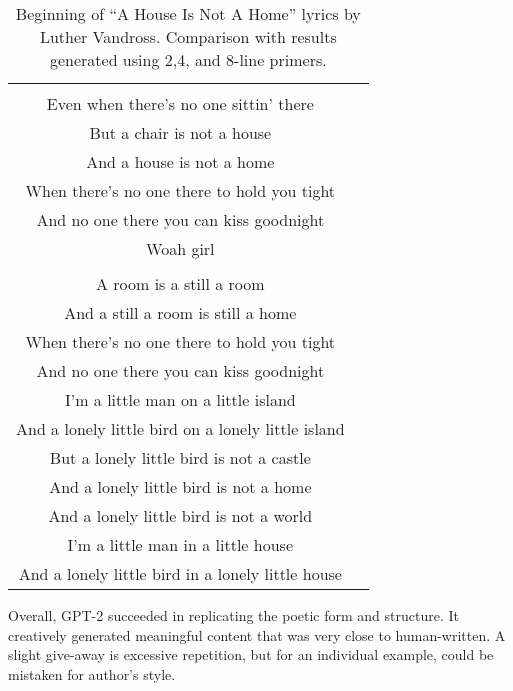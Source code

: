 \begin{table}[!h]
\begin{tabular}{cc}
\begin{minipage}[t]{0.47\textwidth}
	 A chair is still a chair\\
	 Even when there's no one sittin' there\\
	 But a chair is not a house\\
	 And a house is not a home\\
	 When there's no one there to hold you tight\\
	 And no one there you can kiss goodnight\\
	 Woah girl\\
	 \\
	 A room is a still a room\\
	 \color{blue} And a still a room is still a home\\
	 When there's no one there to hold you tight\\
	 And no one there you can kiss goodnight\\
	 I'm a little man on a little island\\
	 And a lonely little bird on a lonely little island\\	 
	 But a lonely little bird is not a castle\\
	 And a lonely little bird is not a home\\
	 And a lonely little bird is not a world\\
	 I'm a little man in a little house\\
	 And a lonely little bird in a lonely little house
	 \end{minipage}\\[6pt]
	\end{tabular}
	\caption{Beginning of ``A House Is Not A Home'' lyrics by Luther Vandross. Comparison with results generated using 2,4, and 8-line primers.}
	\label{generation_result}
\end{table}


Overall, GPT-2 succeeded in replicating the poetic form and structure. It creatively generated meaningful content that was very close to human-written. A slight give-away is excessive repetition, but for an individual example, could be mistaken for author's style.

